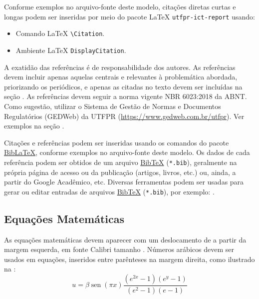 \documentclass[%
  a4paper,%
  12pt,%
  fleqn,%
  english,%
  brazilian,%
]{article}
\begin{document}
Conforme exemplos no arquivo-fonte deste modelo, citações diretas curtas e longas podem ser inseridas por meio do pacote \LaTeX{} \texttt{utfpr-ict-report} usando:

\begin{itemize}
\item Comando \LaTeX{} \texttt{{\textbackslash}Citation}.
\item Ambiente \LaTeX{} \texttt{DisplayCitation}.
\end{itemize}

A exatidão das referências é de responsabilidade dos autores.
As referências devem incluir apenas aquelas centrais e relevantes à problemática abordada, priorizando os periódicos, e apenas as citadas no texto devem ser incluídas na seção .
As referências devem seguir a norma vigente NBR 6023:2018 da ABNT\@.
Como sugestão, utilizar o Sistema de Gestão de Normas e Documentos Regulatórios (GEDWeb) da UTFPR (\url{https://www.gedweb.com.br/utfpr}).
Ver exemplos na seção .

Citações e referências podem ser inseridas usando os comandos do pacote \href{https://ctan.org/pkg/biblatex/}{Bib\LaTeX{}\LinkIcon}, conforme exemplos no arquivo-fonte deste modelo.
Os dados de cada referência podem ser obtidos de um arquivo \href{https://www.bibtex.org/}{Bib\TeX{}\LinkIcon} (\texttt{*.bib}), geralmente na própria página de acesso ou  da publicação (artigos, livros, etc.) ou, ainda, a partir do Google Acadêmico, etc.
Diversas ferramentas podem ser usadas para gerar ou editar entradas de arquivos \href{https://www.bibtex.org/}{Bib\TeX{}\LinkIcon} (\texttt{*.bib}), por exemplo: .

\subsection{Equações Matemáticas}%
\label{ssect:eq-math}

As equações matemáticas devem aparecer com um deslocamento de  a partir da margem esquerda, em fonte Calibri tamanho .
Números arábicos devem ser usados em equações, inseridos entre parênteses na margem direita, como ilustrado na :
\begin{equation}%
\label{eq:u}
u = \beta \operatorname{sen} \left(\pi x\right) \frac{\left(e^{2x} - 1\right) \left(e^y - 1\right)}{\left(e^2 - 1\right) \left(e - 1\right)}
\end{equation}
\end{document}
